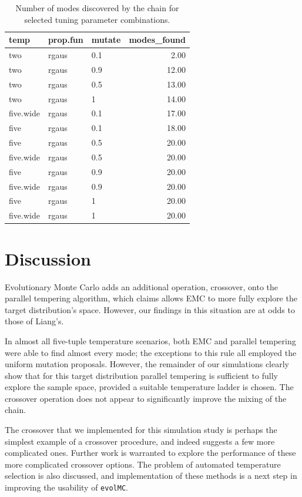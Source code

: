\documentclass[12pt]{article}\usepackage[]{graphicx}\usepackage[]{color}
\begin{document}
\begin{table}
  \centering
  \caption{Number of modes discovered by the chain for selected tuning parameter combinations.}
  \label{table}
  \begin{tabular}{lllr}
    \hline
    temp & prop.fun & mutate & modes\_found \\ 
    \hline
    two & rgaus & 0.1 & 2.00 \\ 
    two & rgaus & 0.9 & 12.00 \\ 
    two & rgaus & 0.5 & 13.00 \\ 
    two & rgaus & 1 & 14.00 \\ 
    five.wide & rgaus & 0.1 & 17.00 \\ 
    five & rgaus & 0.1 & 18.00 \\ 
    five & rgaus & 0.5 & 20.00 \\ 
    five.wide & rgaus & 0.5 & 20.00 \\ 
    five & rgaus & 0.9 & 20.00 \\ 
    five.wide & rgaus & 0.9 & 20.00 \\ 
    five & rgaus & 1 & 20.00 \\ 
    five.wide & rgaus & 1 & 20.00 \\ 
    \hline
  \end{tabular}
\end{table}

\section{Discussion}
\label{sec:discussion}

Evolutionary Monte Carlo adds an additional operation, crossover, onto
the parallel tempering algorithm, which \cite{Liang:2011} claims
allows EMC to more fully explore the target distribution's space.
However, our findings in this situation are at odds to those of Liang's.

In almost all five-tuple temperature scenarios, both EMC and parallel
tempering were able to find almost every mode; the exceptions to this
rule all employed the uniform mutation proposals.  However, the
remainder of our simulations clearly show that for this target
distribution parallel tempering is sufficient to fully explore the
sample space, provided a suitable temperature ladder is chosen. The
crossover operation does not appear to significantly improve the
mixing of the chain.

The crossover that we implemented for this simulation study is perhaps
the simplest example of a crossover procedure, and indeed
\cite{Liang:2011} suggests a few more complicated ones. Further work
is warranted to explore the performance of these more complicated
crossover options. The problem of automated temperature selection is
also discussed, and implementation of these methods is a next step in
improving the usability of {\tt evolMC}.
\end{document}
